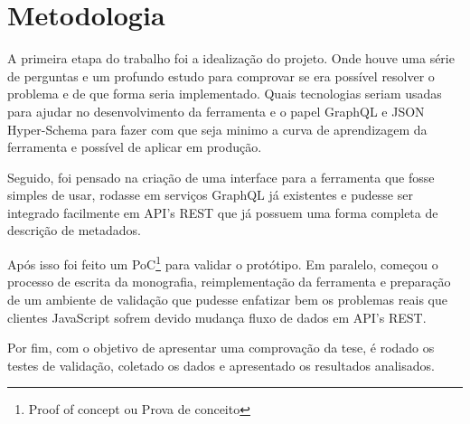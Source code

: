 \section[Metodologia]{Metodologia}

A primeira etapa do trabalho foi a idealização do projeto. Onde houve uma série de perguntas e um profundo estudo para comprovar se era possível resolver o problema e de que forma seria implementado. Quais tecnologias seriam usadas para ajudar no desenvolvimento da ferramenta e o papel GraphQL e JSON Hyper-Schema para fazer com que seja minimo a curva de aprendizagem da ferramenta e possível de aplicar em produção.

Seguido, foi pensado na criação de uma interface para a ferramenta que fosse simples de usar, rodasse em serviços GraphQL já existentes e pudesse ser integrado facilmente em API's REST que já possuem uma forma completa de descrição de metadados.

Após isso foi feito um PoC\footnote{
  Proof of concept ou Prova de conceito
} para validar o protótipo. Em paralelo, começou o processo de escrita da monografia, reimplementação da ferramenta e preparação de um ambiente de validação que pudesse enfatizar bem os problemas reais que clientes JavaScript sofrem devido mudança fluxo de dados em API's REST. 

Por fim, com o objetivo de apresentar uma comprovação da tese, é rodado os testes de validação, coletado os dados e apresentado os resultados analisados.